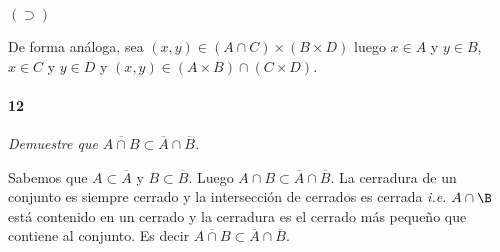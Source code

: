\documentclass[12pt]{article}
\begin{document}
$(\supset)$

De forma análoga, sea $(x,y) \in (A \cap C) \times (B \times D)$ luego  $x \in A $ y $y \in B$, $x \in C$ y $y \in D$ y $(x,y) \in (A \times B) \cap (C \times D)$.

\paragraph{12}
\textit{Demuestre que $\overline{A \cap B} \subset \overline{A} \cap \overline{B}$.}

Sabemos que $A \subset \overline{A}$ y $B \subset \overline{B}$. Luego $A \cap B \subset \overline{A} \cap \overline{B}$. La cerradura de un conjunto es siempre
cerrado y la intersección de cerrados es cerrada \textit{i.e.} $A \cap \B$ está contenido en un cerrado y la cerradura es el cerrado más pequeño que contiene al conjunto. Es decir
$\overline{A \cap B} \subset \overline{A} \cap \overline{B}$.
\end{document}
